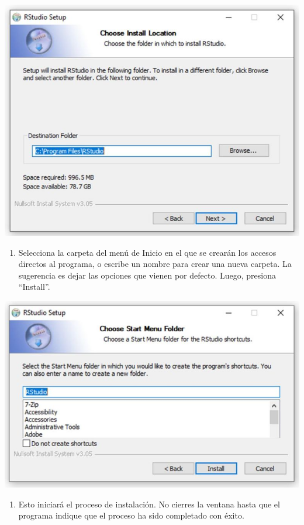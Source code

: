 \documentclass[
]{book}
\providecommand{\tightlist}{%
  \setlength{\itemsep}{0pt}\setlength{\parskip}{0pt}}
\begin{document}
\includegraphics{data/R07.png}

\begin{enumerate}
\def\labelenumi{\arabic{enumi}.}
\setcounter{enumi}{7}
\tightlist
\item
  Selecciona la carpeta del menú de Inicio en el que se crearán los accesos directos al programa, o escribe un nombre para crear una nueva carpeta. La sugerencia es dejar las opciones que vienen por defecto. Luego, presiona ``Install''.
\end{enumerate}

\includegraphics{data/R08.png}

\begin{enumerate}
\def\labelenumi{\arabic{enumi}.}
\setcounter{enumi}{8}
\tightlist
\item
  Esto iniciará el proceso de instalación. No cierres la ventana hasta que el programa indique que el proceso ha sido completado con éxito.
\end{enumerate}
\end{document}
